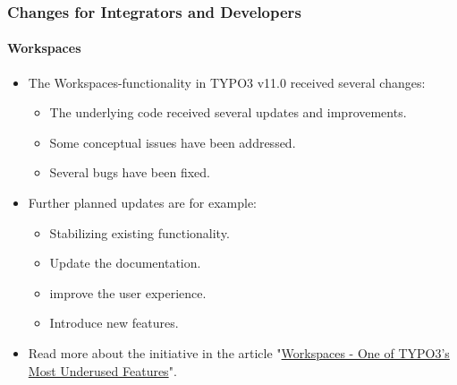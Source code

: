 %

\begin{frame}[fragile]
	\frametitle{Changes for Integrators and Developers}
	\framesubtitle{Workspaces}

	\begin{itemize}
		\item The Workspaces-functionality in TYPO3 v11.0 received several changes:

			\begin{itemize}
				\item The underlying code received several updates and improvements.
				\item Some conceptual issues have been addressed.
				\item Several bugs have been fixed.
			\end{itemize}

		\item Further planned updates are for example:

			\begin{itemize}
				\item Stabilizing existing functionality.
				\item Update the documentation.
				\item improve the user experience.
				\item Introduce new features.
			\end{itemize}

		\item Read more about the initiative in the article
			"\href{https://typo3.org/article/workspaces-one-of-typo3s-most-underused-features}{Workspaces - One of TYPO3's Most Underused Features}".

	\end{itemize}

\end{frame}

